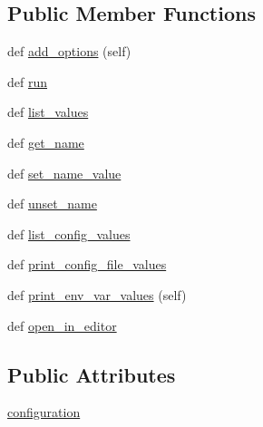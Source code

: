 \subsection*{Public Member Functions}
\begin{DoxyCompactItemize}
\item 
def \hyperlink{classpip_1_1__internal_1_1commands_1_1configuration_1_1ConfigurationCommand_aa2ad2f7172e2f034506eafcea3e9914c}{add\+\_\+options} (self)
\item 
def \hyperlink{classpip_1_1__internal_1_1commands_1_1configuration_1_1ConfigurationCommand_aeaeadaf64be640ee5fb83bc98b04c71d}{run}
\item 
def \hyperlink{classpip_1_1__internal_1_1commands_1_1configuration_1_1ConfigurationCommand_ad53c5c80cffecbbbd1e48641b5dff38b}{list\+\_\+values}
\item 
def \hyperlink{classpip_1_1__internal_1_1commands_1_1configuration_1_1ConfigurationCommand_a098194f442fa76d213676ab3959e67ce}{get\+\_\+name}
\item 
def \hyperlink{classpip_1_1__internal_1_1commands_1_1configuration_1_1ConfigurationCommand_a8e59a29e0e972a018564651d925fb12f}{set\+\_\+name\+\_\+value}
\item 
def \hyperlink{classpip_1_1__internal_1_1commands_1_1configuration_1_1ConfigurationCommand_acddc1a19d8bddaec977c5ba8909a316d}{unset\+\_\+name}
\item 
def \hyperlink{classpip_1_1__internal_1_1commands_1_1configuration_1_1ConfigurationCommand_aa0819879f1035c89d0991a61b8791c76}{list\+\_\+config\+\_\+values}
\item 
def \hyperlink{classpip_1_1__internal_1_1commands_1_1configuration_1_1ConfigurationCommand_a06f7b5e9d8ce055160549e11c8e9cc07}{print\+\_\+config\+\_\+file\+\_\+values}
\item 
def \hyperlink{classpip_1_1__internal_1_1commands_1_1configuration_1_1ConfigurationCommand_a4e69579d21c3eaa8a38684a0bdb94e53}{print\+\_\+env\+\_\+var\+\_\+values} (self)
\item 
def \hyperlink{classpip_1_1__internal_1_1commands_1_1configuration_1_1ConfigurationCommand_a87f0cc8ce988dbeb7c07518e92341214}{open\+\_\+in\+\_\+editor}
\end{DoxyCompactItemize}
\subsection*{Public Attributes}
\begin{DoxyCompactItemize}
\item 
\hyperlink{classpip_1_1__internal_1_1commands_1_1configuration_1_1ConfigurationCommand_a4782ff11ec6237f899e23c6b68a04360}{configuration}
\end{DoxyCompactItemize}
